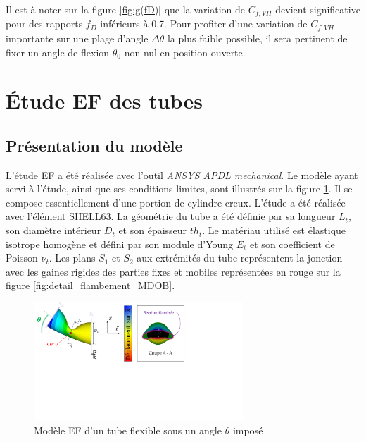 Il est à noter sur la figure \ref{fig:g(fD)} que la variation de $C_{f,VH}$ devient significative pour des rapports $f_D$ inférieurs à 0.7. Pour profiter d'une variation de $C_{f,VH}$ importante sur une plage d'angle $\Delta\theta$ la plus faible possible, il sera pertinent de fixer un angle de flexion $\theta_0$ non nul en position ouverte.
\section{Étude EF des tubes}
\label{sec:5.2}
    	\subsection{Présentation du modèle}
    	\label{subsec:5.2.1 - Présentation du modèle EF}
L'étude EF a été réalisée avec l'outil \emph{ANSYS APDL mechanical}. Le modèle ayant servi à l'étude, ainsi que ses conditions limites, sont illustrés sur la figure \ref{fig:Modele_EF_presentation}. Il se compose essentiellement d'une portion de cylindre creux. L'étude a été réalisée avec l'élément SHELL63. La géométrie du tube a été définie par sa longueur $L_t$, son diamètre intérieur $D_t$ et son épaisseur $th_t$. Le matériau utilisé est élastique isotrope homogène et défini par son module d'Young $E_t$ et son coefficient de Poisson $\nu_t$. Les plans $S_1$ et $S_2$ aux extrémités du tube représentent la jonction avec les gaines rigides des parties fixes et mobiles représentées en rouge sur la figure \ref{fig:detail_flambement_MDOB}.
\begin{figure}[!htbp]
	\begin{center}
		\captionsetup{justification=centering}
		\includegraphics[trim={0cm 9cm 9cm 0cm},clip,width=0.7\textwidth]{../Chap5/Figure/presentation_modele_EF.pdf}
		\caption{Modèle EF d'un tube flexible sous un angle $\theta$ imposé}
		\label{fig:Modele_EF_presentation}
	\end{center}
\end{figure}  

